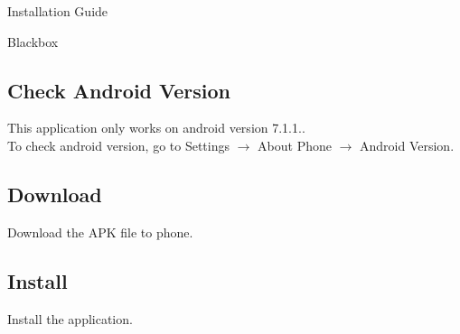 \documentclass{article}
\begin{document}
\begin{center}
{\huge Installation Guide}
\end{center}
\begin{center}
Blackbox
\end{center}
\subsection*{Check Android Version}
This application only works on android version 7.1.1..\\
To check android version, go to Settings $\rightarrow$ About Phone $\rightarrow$ Android Version.

\subsection*{Download}
Download the APK file to phone.

\subsection*{Install}
Install the application.
\end{document}
